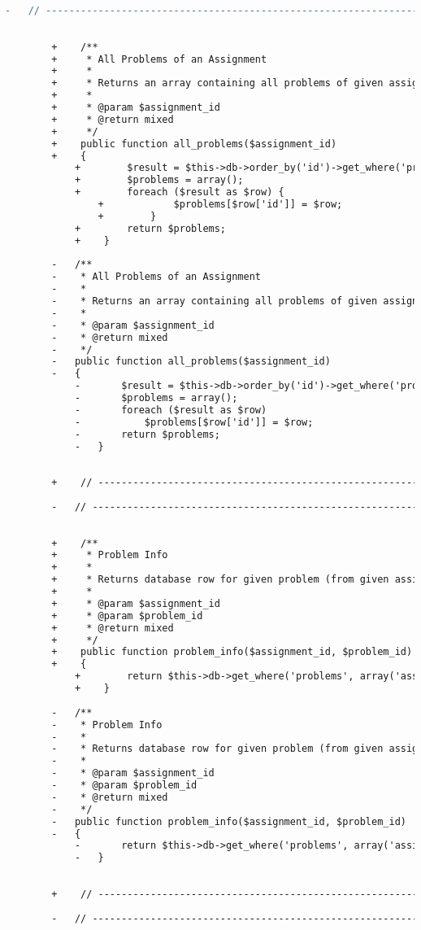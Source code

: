 \begin{lstlisting}[language=diff, caption=Perubahan pada kode Assignment\_model.php]
		-	// ------------------------------------------------------------------------
		
		
		+    /**
		+     * All Problems of an Assignment
		+     *
		+     * Returns an array containing all problems of given assignment
		+     *
		+     * @param $assignment_id
		+     * @return mixed
		+     */
		+    public function all_problems($assignment_id)
		+    {
			+        $result = $this->db->order_by('id')->get_where('problems', array('assignment' => $assignment_id))->result_array();
			+        $problems = array();
			+        foreach ($result as $row) {
				+            $problems[$row['id']] = $row;
				+        }
			+        return $problems;
			+    }
		
		-	/**
		-	 * All Problems of an Assignment
		-	 *
		-	 * Returns an array containing all problems of given assignment
		-	 *
		-	 * @param $assignment_id
		-	 * @return mixed
		-	 */
		-	public function all_problems($assignment_id)
		-	{
			-		$result = $this->db->order_by('id')->get_where('problems', array('assignment'=>$assignment_id))->result_array();
			-		$problems = array();
			-		foreach ($result as $row)
			-			$problems[$row['id']] = $row;
			-		return $problems;
			-	}
		
		
		+    // ------------------------------------------------------------------------
		
		-	// ------------------------------------------------------------------------
		
		
		+    /**
		+     * Problem Info
		+     *
		+     * Returns database row for given problem (from given assignment)
		+     *
		+     * @param $assignment_id
		+     * @param $problem_id
		+     * @return mixed
		+     */
		+    public function problem_info($assignment_id, $problem_id)
		+    {
			+        return $this->db->get_where('problems', array('assignment' => $assignment_id, 'id' => $problem_id))->row_array();
			+    }
		
		-	/**
		-	 * Problem Info
		-	 *
		-	 * Returns database row for given problem (from given assignment)
		-	 *
		-	 * @param $assignment_id
		-	 * @param $problem_id
		-	 * @return mixed
		-	 */
		-	public function problem_info($assignment_id, $problem_id)
		-	{
			-		return $this->db->get_where('problems', array('assignment'=>$assignment_id, 'id'=>$problem_id))->row_array();
			-	}
		
		
		+    // ------------------------------------------------------------------------
		
		-	// ------------------------------------------------------------------------
		

\end{lstlisting}
